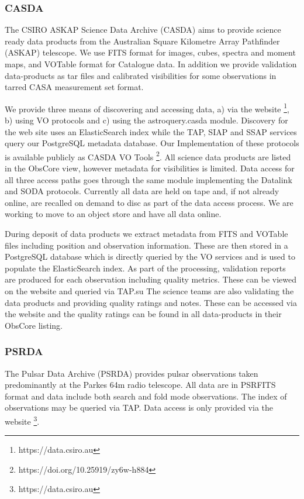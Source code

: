 \documentclass[11pt,a4paper]{ivoatex/ivoa}
\begin{document}
{\subsubsection{CASDA}

The CSIRO ASKAP Science Data Archive (CASDA) aims to provide science ready data products from the Australian Square Kilometre Array Pathfinder (ASKAP) telescope. 
We use FITS format for images, cubes, spectra and moment maps, and VOTable format for Catalogue data. 
In addition we provide validation data-products as tar files and calibrated visibilities for some observations in tarred CASA measurement set format.

We provide three means of discovering and accessing data, a) via the website \footnote{https://data.csiro.au}, b) using VO protocols and c) using the astroquery.casda module. 
Discovery for the web site uses an ElasticSearch index while the TAP, SIAP and SSAP services query our PostgreSQL metadata database. 
Our Implementation of these protocols is available publicly as CASDA VO Tools \footnote{https://doi.org/10.25919/zy6w-h884}.
All science data products are listed in the ObsCore view, however metadata for visibilities is limited. 
Data access for all three access paths goes through the same module implementing the Datalink and SODA protocols. 
Currently all data are held on tape and, if not already online, are recalled on demand to disc as part of the data access process. 
We are working to move to an object store and have all data online.

During deposit of data products we extract metadata from FITS and VOTable files including position and observation information.
These are then stored in a PostgreSQL database which is directly queried by the VO services and is used to populate the ElasticSearch index.
As part of the processing, validation reports are produced for each observation including quality metrics.
These can be viewed on the website and queried via TAP.su
The science teams are also validating the data products and providing quality ratings and notes.
These can be accessed via the website and the quality ratings can be found in all data-products in their ObsCore listing.

\subsubsection{PSRDA}

The Pulsar Data Archive (PSRDA) provides pulsar observations taken predominantly at the Parkes 64m radio telescope.
All data are in PSRFITS format and data include both search and fold mode observations.
The index of observations may be queried via TAP. Data access is only provided via the website \footnote{https://data.csiro.au}.

}
\end{document}
